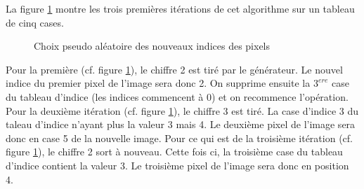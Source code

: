 \documentclass[a4paper]{article}
\begin{document}
        La figure \ref{fig:cipher} montre les trois premières itérations de cet algorithme sur un tableau de cinq cases.

        \begin{figure}[htbp]
            \begin{center}
                \caption{Choix pseudo aléatoire des nouveaux indices des pixels}
                \label{fig:cipher}
            \end{center}
        \end{figure}

        Pour la première (cf. figure \ref{fig:cipher}), le chiffre 2 est tiré par le générateur. Le nouvel indice du premier pixel de l'image sera donc 2. On supprime ensuite la $3^{ere}$ case du tableau d'indice (les indices commencent  à 0) et on recommence l'opération.
        Pour la deuxième itération (cf. figure \ref{fig:cipher}), le chiffre 3 est tiré. La case d'indice 3 du taleau d'indice n'ayant plus la valeur 3 mais 4. Le deuxième pixel de l'image sera donc en case 5 de la nouvelle image.
        Pour ce qui est de la troisième itération (cf. figure \ref{fig:cipher}), le chiffre 2 sort à nouveau. Cette fois ci, la troisième case du tableau d'indice contient la valeur 3. Le troisième pixel de l'image sera donc en position 4.
\end{document}
